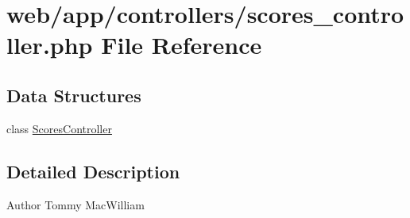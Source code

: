 \hypertarget{scores__controller_8php}{
\section{web/app/controllers/scores\_\-controller.php File Reference}
\label{scores__controller_8php}
}
\subsection*{Data Structures}
\begin{DoxyCompactItemize}
\item 
class \hyperlink{class_scores_controller}{ScoresController}
\end{DoxyCompactItemize}


\subsection{Detailed Description}
\begin{DoxyAuthor}{Author}
Tommy MacWilliam 
\end{DoxyAuthor}

